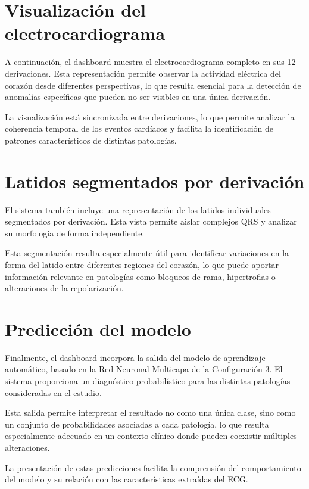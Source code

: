 \documentclass[12pt,a4paper,twoside]{book}
\begin{document}
\section{Visualización del electrocardiograma}

A continuación, el dashboard muestra el electrocardiograma completo en sus 12 derivaciones. Esta representación permite observar la actividad eléctrica del corazón desde diferentes perspectivas, lo que resulta esencial para la detección de anomalías específicas que pueden no ser visibles en una única derivación.

La visualización está sincronizada entre derivaciones, lo que permite analizar la coherencia temporal de los eventos cardíacos y facilita la identificación de patrones característicos de distintas patologías.

\section{Latidos segmentados por derivación}

El sistema también incluye una representación de los latidos individuales segmentados por derivación. Esta vista permite aislar complejos QRS y analizar su morfología de forma independiente.

Esta segmentación resulta especialmente útil para identificar variaciones en la forma del latido entre diferentes regiones del corazón, lo que puede aportar información relevante en patologías como bloqueos de rama, hipertrofias o alteraciones de la repolarización.

\section{Predicción del modelo}

Finalmente, el dashboard incorpora la salida del modelo de aprendizaje automático, basado en la Red Neuronal Multicapa de la Configuración 3. El sistema proporciona un diagnóstico probabilístico para las distintas patologías consideradas en el estudio.

Esta salida permite interpretar el resultado no como una única clase, sino como un conjunto de probabilidades asociadas a cada patología, lo que resulta especialmente adecuado en un contexto clínico donde pueden coexistir múltiples alteraciones.

La presentación de estas predicciones facilita la comprensión del comportamiento del modelo y su relación con las características extraídas del ECG.
\end{document}
